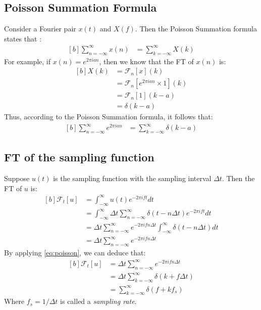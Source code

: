 \documentclass[letterpaper, 11pt]{article}
\newcommand{\fint}{\int_{-\infty}^{\infty}} %
\newcommand{\fsum}[1]{\sum_{#1 = -\infty}^{\infty}} %
\newcommand{\spf}[2]{\Delta #1 \fsum{#2} \delta (#1 - #2 \Delta #1)} %
\newcommand{\fourier}[2]{\mathcal{F}_{#1}[#2]} %
\newcommand{\ft}[3]{\fint #2 e^{-2\pi i#3#1} d#1} %
\numberwithin{equation}{section}
\numberwithin{figure}{section}
\numberwithin{table}{section}
\begin{document}
\subsection{Poisson Summation Formula}
Consider a Fourier pair \(x(t)\) and \(X(f)\). Then the Poisson Summation formula states that \cite{stein}:
\begin{equation}
	\begin{aligned}[b]
		\fsum{n} x(n)	&= \fsum{k} X(k)
	\end{aligned}
\end{equation}
For example, if \(x(n) = e^{2 \pi ian}\), then we know that the FT of \(x(n)\) is:
\begin{equation}
	\begin{aligned}[b]
		X(k)	&= \fourier{n}{x}(k) \\
			&= \fourier{n}{e^{2 \pi ian} \times 1}(k) \\
			&= \fourier{n}{1}(k - a) \\
			&= \delta (k - a)
	\end{aligned}
\end{equation}
Thus, according to the Poisson Summation formula, it follows that:
\begin{equation}
	\begin{aligned}[b]
		\fsum{n} e^{2 \pi ian}
			&= \fsum{k} \delta (k - a)
			\label{eq:poisson}
	\end{aligned}
\end{equation}

\subsection{FT of the sampling function}
Suppose \(u(t)\) is the sampling function with the sampling interval \(\Delta t\). Then the FT of \(u\) is:
\begin{equation}
	\begin{aligned}[b]
		\fourier{t}{u}
			&= \ft{t}{u(t)}{f} \\
			&= \ft{t}{\spf{t}{n}}{f} \\
			&= \Delta t \fsum{n} e^{-2\pi ifn\Delta t} \fint \delta (t - n \Delta t) dt \\
			&= \Delta t \fsum{n} e^{-2\pi ifn\Delta t}
	\end{aligned}
\end{equation}
By applying \eqref{eq:poisson}, we can deduce that:
\begin{equation}
	\begin{aligned}[b]
		\fourier{t}{u}
			&= \Delta t \fsum{n} e^{-2\pi ifn\Delta t} \\
			&= \Delta t \fsum{k} \delta (k + f \Delta t)\\
			&= \fsum{k} \delta (f + kf_{s})
	\end{aligned}
\end{equation}
Where \(f_{s} = 1/\Delta t\) is called a \emph{sampling rate}.
\end{document}
